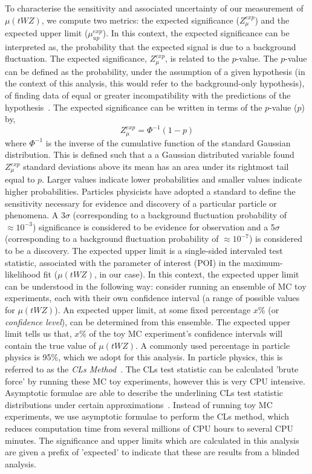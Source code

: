 To characterise the sensitivity and associated uncertainty of our measurement of $\mu (tWZ)$, we compute two metrics: the expected significance ($Z_{\mu}^{exp}$) and the expected upper limit ($\mu_{up}^{exp}$). In this context, the expected significance can be interpreted as, the probability that the expected signal is due to a background fluctuation. The expected significance, $Z_{\mu}^{exp}$, is related to the $p$-value. The $p$-value can be defined as the probability, under the assumption of a given hypothesis (in the context of this analysis, this would refer to the background-only hypothesis), of finding data of equal or greater incompatibility with the predictions of the hypothesis~\cite{Cowan_2011}. The expected significance can be written in terms of the $p$-value ($p$) by,
\begin{equation}
 Z_{\mu}^{exp} = \Phi^{-1} (1-p)
\end{equation}
where $\Phi^{-1}$ is the inverse of the cumulative function of the standard Gaussian distribution. This is defined such that a a Gaussian distributed variable found $Z_{\mu}^{exp}$ standard deviations above its mean has an area under its rightmost tail equal to $p$. Larger values indicate lower probabilities and smaller values indicate higher probabilities. Particles physicists have adopted a standard to define the sensitivity necessary for evidence and discovery of a particular particle or phenomena. A 3$\sigma$ (corresponding to a background fluctuation probability of $\approx 10^{-3}$) significance is considered to be evidence for observation and a 5$\sigma$ (corresponding to a background fluctuation probability of $\approx 10^{-7}$) is considered to be a discovery. The expected upper limit is a single-sided intervaled test statistic, associated with the parameter of interest (POI) in the maximum-likelihood fit ($\mu (tWZ)$, in our case). In this context, the expected upper limit can be understood in the following way: consider running an ensemble of MC toy experiments, each with their own confidence interval (a range of possible values for $\mu (tWZ)$). An expected upper limit, at some fixed percentage $x\%$ (or \textit{confidence level}), can be determined from this ensemble. The expected upper limit tells us that, $x\%$ of the toy MC experiment's confidence intervals will contain the true value of $\mu (tWZ)$. A commonly used percentage in particle physics is 95$\%$, which we adopt for this analysis. In particle physics, this is referred to as the \textit{CLs Method}~\cite{Cowan_2011}. The CLs test statistic can be calculated 'brute force' by running these MC toy experiments, however this is very CPU intensive. Asymptotic formulae are able to describe the underlining CLs test statistic distributions under certain approximations~\cite{asymptotic-formulae-slides}. Instead of running toy MC experiments, we use asymptotic formulae to perform the CLs method, which reduces computation time from several millions of CPU hours to several CPU minutes. The significance and upper limits which are calculated in this analysis are given a prefix of 'expected' to indicate that these are results from a blinded analysis. 

